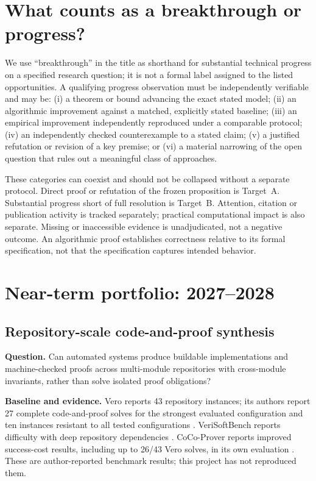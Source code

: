\documentclass[11pt]{article}
\begin{document}
\section{What counts as a breakthrough or progress?}
We use ``breakthrough'' in the title as shorthand for substantial technical progress on a specified research question; it is not a formal label assigned to the listed opportunities. A qualifying progress observation must be independently verifiable and may be: (i) a theorem or bound advancing the exact stated model; (ii) an algorithmic improvement against a matched, explicitly stated baseline; (iii) an empirical improvement independently reproduced under a comparable protocol; (iv) an independently checked counterexample to a stated claim; (v) a justified refutation or revision of a key premise; or (vi) a material narrowing of the open question that rules out a meaningful class of approaches.

These categories can coexist and should not be collapsed without a separate protocol. Direct proof or refutation of the frozen proposition is Target~A. Substantial progress short of full resolution is Target~B. Attention, citation or publication activity is tracked separately; practical computational impact is also separate. Missing or inaccessible evidence is unadjudicated, not a negative outcome. An algorithmic proof establishes correctness relative to its formal specification, not that the specification captures intended behavior.

\section{Near-term portfolio: 2027--2028}
\subsection{Repository-scale code-and-proof synthesis}
\textbf{Question.} Can automated systems produce buildable implementations and machine-checked proofs across multi-module repositories with cross-module invariants, rather than solve isolated proof obligations?

\textbf{Baseline and evidence.} Vero reports 43 repository instances; its authors report 27 complete code-and-proof solves for the strongest evaluated configuration and ten instances resistant to all tested configurations \citep{ye2026vero}. VeriSoftBench reports difficulty with deep repository dependencies \citep{xin2026verisoft}. CoCo-Prover reports improved success-cost results, including up to 26/43 Vero solves, in its own evaluation \citep{yao2026cocoprover}. These are author-reported benchmark results; this project has not reproduced them.
\end{document}
